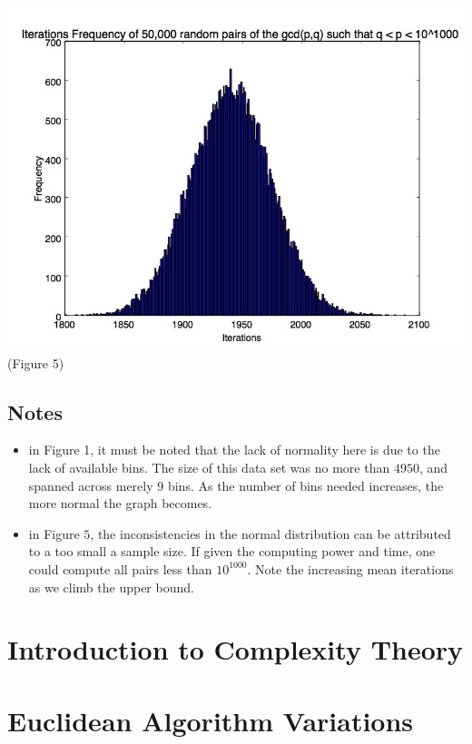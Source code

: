 \documentclass{beamer}
\begin{document}
\begin{frame}
		\center \includegraphics[scale=.3]{1000_digit_numbers.jpg}
		\center \tiny(Figure 5)

\end{frame}

\subsection{Notes}
\begin{frame}
\begin{itemize}
\item in Figure 1, it must be noted that the lack of normality here is due to the lack of available bins. The size of this data set was no more than $4950$, and spanned across merely $9$ bins. As the number of bins needed increases, the more normal the graph becomes.
\item in Figure $5$, the inconsistencies in the normal distribution can be attributed to a too small a sample size. If given the computing power and time, one could compute all pairs less than $10^{1000}$. Note the increasing mean iterations as we climb the upper bound.
\end{itemize}

\end{frame}

\section{Introduction to Complexity Theory}

\section{Euclidean Algorithm Variations}
\end{document}
